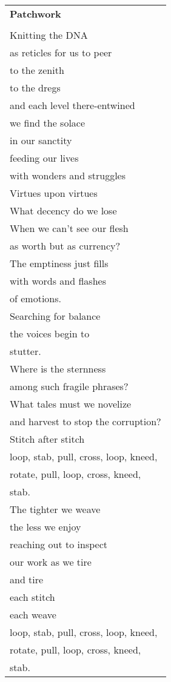 \documentclass{article}
\begin{document}
\begin{center}
\begin{tabular}{l}
\textbf{Patchwork} \\
\\
Knitting the DNA \\
as reticles for us to peer \\
to the zenith \\
to the dregs \\
and each level there-entwined \\
we find the solace \\
in our sanctity \\
feeding our lives \\
with wonders and struggles \\
Virtues upon virtues \\
What decency do we lose \\
When we can't see our flesh \\
as worth but as currency? \\
The emptiness just fills \\
with words and flashes \\
of emotions. \\
Searching for balance \\
the voices begin to \\
stutter. \\
Where is the sternness \\
among such fragile phrases? \\
What tales must we novelize \\
and harvest to stop the corruption? \\
Stitch after stitch \\
loop, stab, pull, cross, loop, kneed, \\
rotate, pull, loop, cross, kneed, \\
stab. \\
The tighter we weave \\
the less we enjoy \\
reaching out to inspect \\
our work as we tire \\
and tire \\
each stitch \\
each weave \\
loop, stab, pull, cross, loop, kneed, \\
rotate, pull, loop, cross, kneed, \\
stab. \\
\end{tabular}
\end{center}
\end{document}
